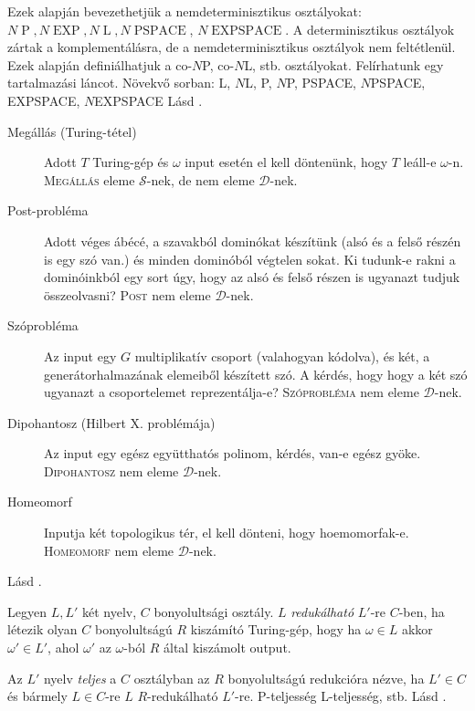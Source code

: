 \documentclass[%
	DIV=15,appendixprefix]{scrreprt}
\theoremstyle{definition}
\theoremstyle{remark}
\DeclareMathOperator{\Pbonya}{P}
\DeclareMathOperator{\EXP}{EXP}
\DeclareMathOperator{\PSPACE}{PSPACE}
\DeclareMathOperator{\EXPSPACE}{EXPSPACE}
\DeclareMathOperator{\Lbonya}{L}
\begin{document}
Ezek alapján bevezethetjük a
nemdeterminisztikus osztályokat: $N\Pbonya,{} N \EXP,{} N\Lbonya,{} N\PSPACE $, $N\EXPSPACE$. A
determinisztikus osztályok zártak a komplementálásra, de a nemdeterminisztikus osztályok
nem feltétlenül. Ezek alapján definiálhatjuk a co-$N$P, co-$N$L, stb. osztályokat. Felírhatunk egy
tartalmazási láncot. Növekvő sorban: L, $N$L, P, $N$P, PSPACE, $N$PSPACE, EXPSPACE, $N$EXPSPACE
%
Lásd
\cite[\href{http://www.math.u-szeged.hu/~hajnal/courses/MSc_Bonyolultsag/ea04.pdf}{
\emph{Példák}}]{Bonya}.
\begin{description}
	\item[Megállás (Turing-tétel)] Adott $T$ Turing-gép és $\omega$ input esetén el kell döntenünk,
		hogy $T$ leáll-e $\omega$-n. \textsc{Megállás} eleme $\mathcal{S}$-nek, de nem eleme
		$\mathcal{D}$-nek.
	\item[Post-probléma] Adott véges ábécé, a szavakból dominókat készítünk (alsó és a felső részén
		is egy szó van.) és minden dominóból végtelen sokat. Ki tudunk-e rakni a dominóinkból egy
		sort úgy, hogy az alsó és felső részen is ugyanazt tudjuk összeolvasni? \textsc{Post} nem
		eleme $\mathcal{D}$-nek.
	\item[Szóprobléma] Az input egy $G$ multiplikatív csoport (valahogyan kódolva), és két, a
		generátorhalmazának elemeiből készített szó. A kérdés, hogy hogy a két szó ugyanazt a
		csoportelemet reprezentálja-e? \textsc{Szóprobléma} nem eleme $\mathcal{D}$-nek.
	\item[Dipohantosz (Hilbert X. problémája)] Az input egy egész együtthatós polinom, kérdés, van-e
		egész gyöke. \textsc{Dipohantosz} nem eleme $\mathcal{D}$-nek.
	\item[Homeomorf] Inputja két topologikus tér, el kell dönteni, hogy hoemomorfak-e.
		\textsc{Homeomorf} nem eleme $\mathcal{D}$-nek.
\end{description}
%
Lásd
\cite[\href{http://www.math.u-szeged.hu/~hajnal/courses/MSc_Bonyolultsag/ea05.pdf}{
\emph{Redukciók, teljes nyelvek\ldots}}]{Bonya}.

Legyen $L,{}L'$ két nyelv, $C$ bonyolultsági osztály. $L$ \emph{redukálható} $L'$-re $C$-ben, ha
létezik
olyan $C$ bonyolultságú $R$ kiszámító Turing-gép, hogy ha $\omega \in L$ akkor $\omega' \in L'$,
ahol $\omega'$ az $\omega$-ból $R$ által kiszámolt output.

Az $L'$ nyelv \emph{teljes} a $C$ osztályban az $R$ bonyolultságú redukcióra nézve, ha $L' \in C$
és bármely $L \in C$-re $L$ $R$-redukálható $L'$-re. P-teljesség L-teljesség, stb.
%
Lásd
\cite[\href{http://www.math.u-szeged.hu/~hajnal/courses/MSc_Bonyolultsag/ea07.pdf}{
\emph{P-teljes és NP-teljes problémák, Cook-Levin tétel}}]{Bonya}.
\end{document}
